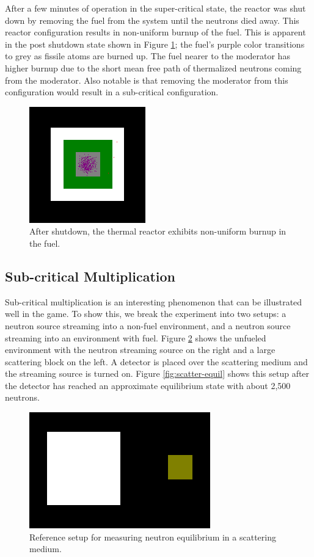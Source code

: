 \documentclass{anstrans}
\begin{document}
After a few minutes of operation in the super-critical state, the reactor was
shut down by removing the fuel from the system until the neutrons died away.
This reactor configuration results in non-uniform burnup of the fuel. This is
apparent in the post shutdown state shown in Figure \ref{fig:thermal-after};
the fuel's purple color transitions to grey as fissile atoms are burned up.
The fuel nearer to the moderator has higher burnup due to the short mean free
path of thermalized neutrons coming from the moderator.  Also notable is that
removing the moderator from this configuration would result in a sub-critical
configuration. 

\begin{figure}
    \centering
    \includegraphics{reactor-thermal-after.png}
    \caption{After shutdown, the thermal reactor exhibits non-uniform burnup in the fuel. }
    \label{fig:thermal-after}
\end{figure}

\subsection{Sub-critical Multiplication}

Sub-critical multiplication is an interesting phenomenon that can be
illustrated well in the game.  To show this, we break the experiment into two
setups: a neutron source streaming into a non-fuel environment, and a neutron
source streaming into an environment with fuel.  Figure
\ref{fig:scatter-setup} shows the unfueled environment with the neutron
streaming source on the right and a large scattering block on the left.  A
detector is placed over the scattering medium and the streaming source is
turned on. Figure \ref{fig:scatter-equil} shows this setup after the detector
has reached an approximate equilibrium state with about 2,500 neutrons.

\begin{figure}
    \centering
    \includegraphics{scatter-setup.png}
    \caption{Reference setup for measuring neutron equilibrium in a scattering medium.}
    \label{fig:scatter-setup}
\end{figure}
\end{document}
